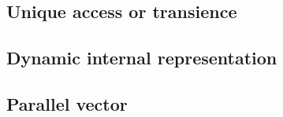 \subsection{Unique access or transience}
\subsection{Dynamic internal representation}

\subsection{Parallel vector}

